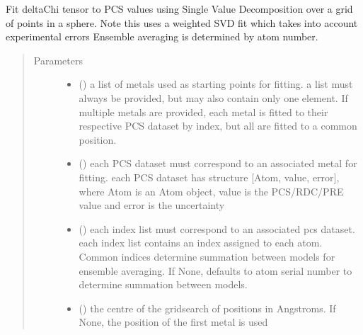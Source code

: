 \documentclass[a4paper,10pt,english]{sphinxmanual}
\begin{document}
\begin{fulllineitems}
\label{\detokenize{reference/generated/paramagpy.fit.svd_gridsearch_fit_metal_from_pcs:paramagpy.fit.svd_gridsearch_fit_metal_from_pcs}}
Fit deltaChi tensor to PCS values using Single Value Decomposition over
a grid of points in a sphere.
Note this uses a weighted SVD fit which takes into account
experimental errors
Ensemble averaging is determined by atom number.
\begin{quote}\begin{description}
\item[{Parameters}] \leavevmode\begin{itemize}
\item {} 
 () \textendash{} a list of metals used as starting points for fitting.
a list must always be provided, but may also contain
only one element. If multiple metals are provided, each metal
is fitted to their respective PCS dataset by index, but all are
fitted to a common position.

\item {} 
 () \textendash{} each PCS dataset must correspond to an associated metal for fitting.
each PCS dataset has structure {[}Atom, value, error{]}, where Atom is
an Atom object, value is the PCS/RDC/PRE value
and error is the uncertainty

\item {} 
 (\sphinxstyleliteralemphasis{\sphinxupquote{, }}) \textendash{} each index list must correspond to an associated pcs dataset.
each index list contains an index assigned to each atom.
Common indices determine summation between models
for ensemble averaging.
If None, defaults to atom serial number to determine summation
between models.

\item {} 
 (\sphinxstyleliteralemphasis{\sphinxupquote{, }}) \textendash{} the centre of the gridsearch of positions in Angstroms.
If None, the position of the first metal is used


\end{itemize}
\end{description}
\end{quote}
\end{fulllineitems}
\end{document}
